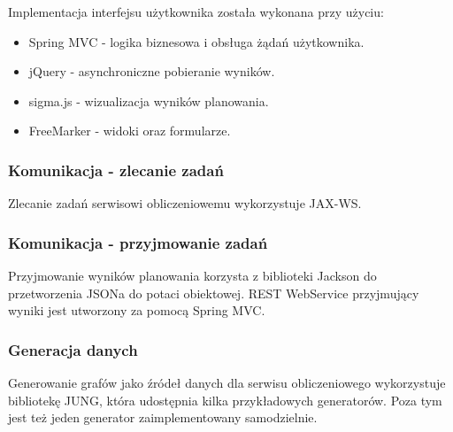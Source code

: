 Implementacja interfejsu użytkownika została wykonana przy użyciu:
\begin{itemize}
	\item Spring MVC - logika biznesowa i obsługa żądań użytkownika.
	\item jQuery - asynchroniczne pobieranie wyników.
	\item sigma.js - wizualizacja wyników planowania.
	\item FreeMarker - widoki oraz formularze.
\end{itemize}

\subsubsection{Komunikacja - zlecanie zadań}

Zlecanie zadań serwisowi obliczeniowemu wykorzystuje JAX-WS.

\subsubsection{Komunikacja - przyjmowanie zadań}

Przyjmowanie wyników planowania korzysta z biblioteki Jackson do przetworzenia JSONa do potaci obiektowej.
REST WebService przyjmujący wyniki jest utworzony za pomocą Spring MVC.

\subsubsection{Generacja danych}

Generowanie grafów jako źródeł danych dla serwisu obliczeniowego wykorzystuje bibliotekę JUNG, która udostępnia kilka przykładowych generatorów.
Poza tym jest też jeden generator zaimplementowany samodzielnie.
